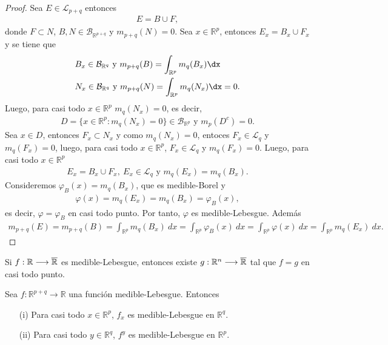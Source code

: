 \begin{proof}
Sea $E \in \mathcal{L}_{p+q}$ entonces
\begin{align*}
    E = B \cup F,
\end{align*}
donde $F \subset N$, $B, N \in \mathcal{B}_{\mathbb{R}^{p+q}}$ y $m_{p+q}(N) = 0$. Sea $x \in \mathbb{R}^p$, entonces $E_x = B_x \cup F_x$ y se tiene que
\begin{align*}
   &B_x \in \mathcal{B}_{\mathbb{R}^{q}} \text{ y } m_{p+q}(B) = \int_{\mathbb{R}^p}{m_q(B_x) \dx} \\
    &N_x \in \mathcal{B}_{\mathbb{R}^{q}} \text{ y } m_{p+q}(N) = \int_{\mathbb{R}^p}{m_q(N_x) \dx} = 0.
\end{align*}
Luego, para casi todo $x \in \mathbb{R}^p$ $m_q(N_x) = 0$, es decir,
\begin{align*}
    D = \{ x \in \mathbb{R}^p : m_q(N_x) = 0 \} \in \mathcal{B}_{\mathbb{R}^{p}} \text{ y } m_p(D^c) = 0.
\end{align*}
Sea $x \in D$, entonces $F_x \subset N_x$ y como $m_q(N_x) = 0$, entoces $F_x \in \mathcal{L}_{q}$ y $m_q(F_x) = 0$, luego, para casi todo $x \in \mathbb{R}^p$, $F_x \in \mathcal{L}_{q}$ y $m_q(F_x) = 0$. Luego, para casi todo $x \in \mathbb{R}^p$
\begin{align*}
    E_x = B_x \cup F_x, \ E_x \in \mathcal{L}_q \text{ y } m_q(E_x) = m_q(B_x).
\end{align*}
Consideremos $\varphi_B(x) = m_q(B_x)$, que es medible-Borel y
\begin{align*}
    \varphi(x) = m_q(E_x) = m_q(B_x) = \varphi_B(x),
\end{align*}
es decir, $\varphi = \varphi_B$ en casi todo punto. Por tanto, $\varphi$ es medible-Lebesgue. Además
\begin{align*}
    m_{p+q}(E) = m_{p+q}(B) = \int_{\mathbb{R}^p}{m_q(B_x) \ dx} = \int_{\mathbb{R}^p}{\varphi_B(x) \ dx} =  \int_{\mathbb{R}^p}{\varphi(x) \ dx} = \int_{\mathbb{R}^p}{m_q(E_x) \ dx}.
\end{align*}
\end{proof}

\begin{lema}
Si $f: \mathbb{R} \longrightarrow \overline{\mathbb{R}}$ es medible-Lebesgue, entonces existe $g: \mathbb{R}^n \longrightarrow \overline{\mathbb{R}}$ tal que $f = g$ en casi todo punto.
\end{lema}

\begin{prop}
Sea $f: \mathbb{R}^{p+q} \longrightarrow \mathbb{R}$ una función medible-Lebesgue. Entonces
\begin{enumerate}
    \item[(i)] Para casi todo $x \in \mathbb{R}^p$, $f_x$ es medible-Lebesgue en $\mathbb{R}^q$.
    \item[(ii)] Para casi todo $y \in \mathbb{R}^q$, $f^y$ es medible-Lebesgue en $\mathbb{R}^p$.
\end{enumerate}
\end{prop}


